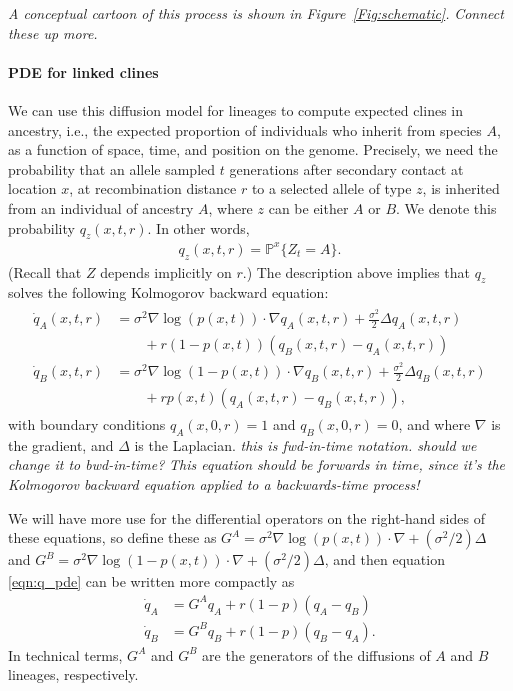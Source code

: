\documentclass[11pt,letterpaper]{article}
\newcommand{\alisa}[1]{{\em \color{red} #1}}
\newcommand{\plr}[1]{{\em \color{blue} #1}}
\renewcommand{\P}{\mathbb{P}}
\newcommand{\grad}{\nabla}
\begin{document}
\alisa{A conceptual cartoon of this process is shown in Figure~\ref{Fig:schematic}.}
\plr{Connect these up more.}



\paragraph{PDE for linked clines}
We can use this diffusion model for lineages to compute expected clines in ancestry,
i.e., the expected proportion of individuals who inherit from species $A$,
as a function of space, time, and position on the genome.
Precisely, we need the probability that 
an allele sampled $t$ generations after secondary contact at location $x$,
at recombination distance $r$ to a selected allele of type $z$,
is inherited from an individual of ancestry $A$,
where $z$ can be either $A$ or $B$.
We denote this probability $q_z(x,t,r)$.
In other words,
\begin{align}
    q_z(x,t,r) = \P^x \{Z_t = A\} .
\end{align}
(Recall that $Z$ depends implicitly on $r$.)
The description above implies that $q_z$ solves the following Kolmogorov backward equation:
\begin{align}
    \begin{aligned}  \label{eqn:q_pde}
    \dot q_A(x,t,r) 
            &= \sigma^2 \grad \log(p(x,t)) \cdot \grad q_A(x,t,r) 
                + \frac{\sigma^2}{2} \Delta q_A(x,t,r) 
            \\ &\qquad {} + 
                r (1-p(x,t))(q_B(x,t,r)-q_A(x,t,r))  \\
    \dot q_B(x,t,r) &= \sigma^2 \grad \log(1-p(x,t)) \cdot \grad q_B(x,t,r) 
            + \frac{\sigma^2}{2} \Delta q_B(x,t,r)
            \\ &\qquad {} + 
            r p(x,t) (q_A(x,t,r)-q_B(x,t,r))  ,
    \end{aligned} 
\end{align}
with boundary conditions $q_A(x,0,r)=1$ and $q_B(x,0,r)=0$, 
and where $\grad$ is the gradient, and $\Delta$ is the Laplacian.
\alisa{this is fwd-in-time notation. should we change it to bwd-in-time?}
\plr{This equation should be forwards in time, since it's the Kolmogorov backward equation
applied to a backwards-time process!}

We will have more use for the differential operators on the right-hand sides of these equations,
so define these as
$G^A = \sigma^2 \grad \log(p(x,t)) \cdot \grad + (\sigma^2/2) \Delta$
and
$G^B = \sigma^2 \grad \log(1-p(x,t)) \cdot \grad + (\sigma^2/2) \Delta$,
and then equation \eqref{eqn:q_pde} can be written more compactly as
\begin{align*}
    \dot q_A &= G^A q_A + r (1-p) (q_A-q_B) \\
    \dot q_B &= G^B q_B + r (1-p) (q_B-q_A) .
\end{align*}
In technical terms, $G^A$ and $G^B$ are the generators of the diffusions of $A$ and $B$ lineages, respectively.
\end{document}
